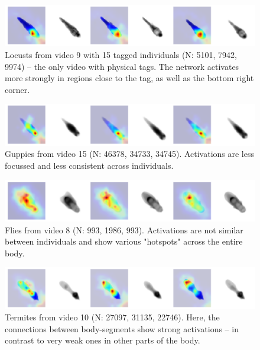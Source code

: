 \documentclass[multi=figure,9pt]{standalone}
\makeatletter
\renewenvironment{figure}%
{\def\@captype{figure}%
\minipage{\textwidth}}%
{\endminipage}
\makeatother
\begin{document}
\begin{figure}
    \centering
    \begin{subfigure}[b]{0.9\textwidth}
            \centering
           \includegraphics[width=\textwidth]{activations15locusts1h.pdf}
            \caption{Locusts from video 9 with 15 tagged individuals (N: 5101, 7942, 9974) -- the only video with physical tags. The network activates more strongly in regions close to the tag, as well as the bottom right corner.
            }
            \label{fig:activate_locusts}
    \end{subfigure}
    \begin{subfigure}[b]{0.9\textwidth}
           \centering
           	\includegraphics[width=\textwidth]{activationsguppy_8_t36_d15_20191212_085800.pdf}
            \caption{Guppies from video 15 (N: 46378, 34733, 34745). Activations are less focussed and less consistent across individuals.}
            \label{fig:activate_guppies}
    \end{subfigure}
    \begin{subfigure}[b]{0.9\textwidth}
            \centering\includegraphics[width=\textwidth]{activationsflies_N59.pdf}
            \caption{Flies from video 8 (N: 993, 1986, 993). Activations are not similar between individuals and show various "hotspots" across the entire body.}
            \label{fig:activate_flies}
    \end{subfigure}
    \begin{subfigure}[b]{0.9\textwidth}
            \centering\includegraphics[width=\textwidth]{activationsN05HHS2019-10S-V1.pdf}
            \caption{Termites from video 10 (N: 27097, 31135, 22746). Here, the connections between body-segments show strong activations -- in contrast to very weak ones in other parts of the body. %
            }
            \label{fig:activate_termites}
    \end{subfigure}
\end{figure}
\end{document}
